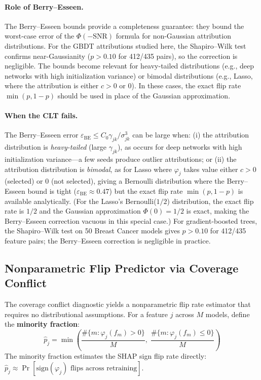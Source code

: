 \documentclass{article}
\begin{document}
\paragraph{Role of Berry--Esseen.}
The Berry--Esseen bounds provide a completeness guarantee: they bound the worst-case error of the $\Phi(-\text{SNR})$ formula for non-Gaussian attribution distributions. For the GBDT attributions studied here, the Shapiro--Wilk test confirms near-Gaussianity ($p > 0.10$ for 412/435 pairs), so the correction is negligible. The bounds become relevant for heavy-tailed distributions (e.g., deep networks with high initialization variance) or bimodal distributions (e.g., Lasso, where the attribution is either $c > 0$ or $0$). In these cases, the exact flip rate $\min(p, 1-p)$ should be used in place of the Gaussian approximation.

\paragraph{When the CLT fails.}
The Berry--Esseen error $\varepsilon_{\text{BE}} \leq C_0 \gamma_{jk}/\sigma_{jk}^3$ can be large when: (i) the attribution distribution is \emph{heavy-tailed} (large $\gamma_{jk}$), as occurs for deep networks with high initialization variance---a few seeds produce outlier attributions; or (ii) the attribution distribution is \emph{bimodal}, as for Lasso where $\varphi_j$ takes value either $c > 0$ (selected) or $0$ (not selected), giving a Bernoulli distribution where the Berry--Esseen bound is tight ($\varepsilon_{\text{BE}} \approx 0.47$) but the exact flip rate $\min(p, 1-p)$ is available analytically. (For the Lasso's Bernoulli($1/2$) distribution, the exact flip rate is $1/2$ and the Gaussian approximation $\Phi(0) = 1/2$ is exact, making the Berry--Esseen correction vacuous in this special case.) For gradient-boosted trees, the Shapiro--Wilk test on 50 Breast Cancer models gives $p > 0.10$ for 412/435 feature pairs; the Berry--Esseen correction is negligible in practice.

\subsection{Nonparametric Flip Predictor via Coverage Conflict}
\label{sec:nonparametric-flip}

The coverage conflict diagnostic yields a nonparametric flip rate estimator that requires no distributional assumptions. For a feature $j$ across $M$ models, define the \textbf{minority fraction}:
$$\hat{p}_j = \min\!\left(\frac{\#\{m : \varphi_j(f_m) > 0\}}{M},\; \frac{\#\{m : \varphi_j(f_m) \leq 0\}}{M}\right)$$
The minority fraction estimates the SHAP sign flip rate directly: $\hat{p}_j \approx \Pr[\text{sign}(\varphi_j) \text{ flips across retraining}]$.
\end{document}
